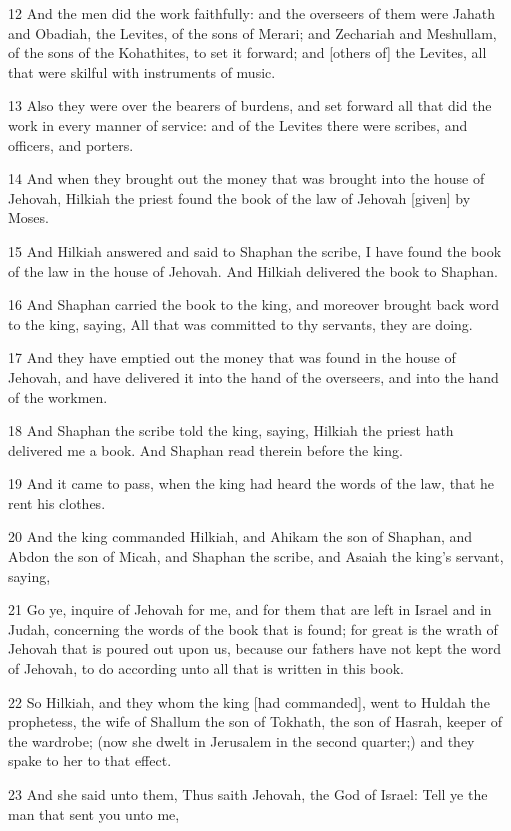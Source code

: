 \par 12 And the men did the work faithfully: and the overseers of them were Jahath and Obadiah, the Levites, of the sons of Merari; and Zechariah and Meshullam, of the sons of the Kohathites, to set it forward; and [others of] the Levites, all that were skilful with instruments of music.
\par 13 Also they were over the bearers of burdens, and set forward all that did the work in every manner of service: and of the Levites there were scribes, and officers, and porters.
\par 14 And when they brought out the money that was brought into the house of Jehovah, Hilkiah the priest found the book of the law of Jehovah [given] by Moses.
\par 15 And Hilkiah answered and said to Shaphan the scribe, I have found the book of the law in the house of Jehovah. And Hilkiah delivered the book to Shaphan.
\par 16 And Shaphan carried the book to the king, and moreover brought back word to the king, saying, All that was committed to thy servants, they are doing.
\par 17 And they have emptied out the money that was found in the house of Jehovah, and have delivered it into the hand of the overseers, and into the hand of the workmen.
\par 18 And Shaphan the scribe told the king, saying, Hilkiah the priest hath delivered me a book. And Shaphan read therein before the king.
\par 19 And it came to pass, when the king had heard the words of the law, that he rent his clothes.
\par 20 And the king commanded Hilkiah, and Ahikam the son of Shaphan, and Abdon the son of Micah, and Shaphan the scribe, and Asaiah the king's servant, saying,
\par 21 Go ye, inquire of Jehovah for me, and for them that are left in Israel and in Judah, concerning the words of the book that is found; for great is the wrath of Jehovah that is poured out upon us, because our fathers have not kept the word of Jehovah, to do according unto all that is written in this book.
\par 22 So Hilkiah, and they whom the king [had commanded], went to Huldah the prophetess, the wife of Shallum the son of Tokhath, the son of Hasrah, keeper of the wardrobe; (now she dwelt in Jerusalem in the second quarter;) and they spake to her to that effect.
\par 23 And she said unto them, Thus saith Jehovah, the God of Israel: Tell ye the man that sent you unto me,
